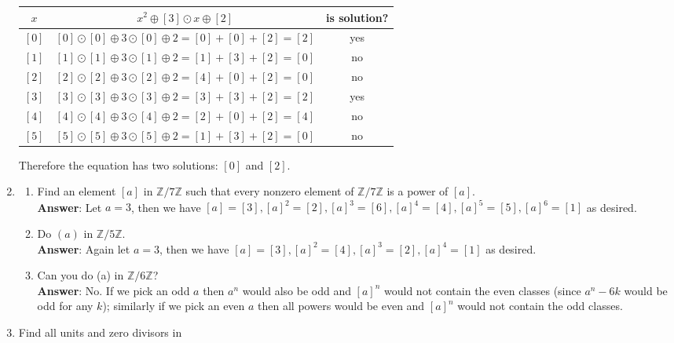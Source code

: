 \documentclass{article}
\begin{document}
\begin{enumerate}
\begin{center}
                  \begin{tabular}{c|c|c}
                        $x$   & $x^2\oplus [3]\odot x\oplus [2]$                        & is solution? \\
                        \hline
                        $[0]$ & $[0]\odot [0]\oplus 3\odot [0]\oplus 2=[0]+[0]+[2]=[2]$ & yes          \\
                        $[1]$ & $[1]\odot [1]\oplus 3\odot [1]\oplus 2=[1]+[3]+[2]=[0]$ & no           \\
                        $[2]$ & $[2]\odot [2]\oplus 3\odot [2]\oplus 2=[4]+[0]+[2]=[0]$ & no           \\
                        $[3]$ & $[3]\odot [3]\oplus 3\odot [3]\oplus 2=[3]+[3]+[2]=[2]$ & yes          \\
                        $[4]$ & $[4]\odot [4]\oplus 3\odot [4]\oplus 2=[2]+[0]+[2]=[4]$ & no           \\
                        $[5]$ & $[5]\odot [5]\oplus 3\odot [5]\oplus 2=[1]+[3]+[2]=[0]$ & no
                  \end{tabular}
            \end{center}
            Therefore the equation has two solutions: $[0]$ and $[2]$.
      \item
            \begin{enumerate}
                  \item Find an element $[a]$ in $\mathbb{Z}/7\mathbb{Z}$ such that every nonzero element of $\mathbb{Z}/7\mathbb{Z}$ is a power of $[a]$.\\
                        \textbf{Answer}: Let $a=3$, then we have $[a]=[3],[a]^2=[2],[a]^3=[6],[a]^4=[4],[a]^5=[5],[a]^6=[1]$ as desired.
                  \item Do $(a)$ in $\mathbb{Z}/5\mathbb{Z}$.\\
                        \textbf{Answer}: Again let $a=3$, then we have $[a]=[3],[a]^2=[4],[a]^3=[2],[a]^4=[1]$ as desired.
                  \item Can you do (a) in $\mathbb{Z}/6\mathbb{Z}$?\\
                        \textbf{Answer}: No. If we pick an odd $a$ then $a^n$ would also be odd and $[a]^n$ would not contain the even classes (since $a^n-6k$ would be odd for any $k$); similarly if we pick an even $a$ then all powers would be even and $[a]^n$ would not contain the odd classes.
            \end{enumerate}
      \item Find all units and zero divisors in

\end{enumerate}
\end{document}
